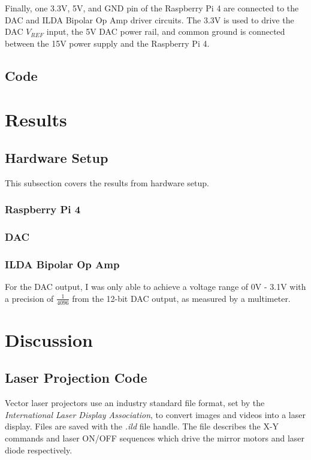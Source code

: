 \documentclass[journal]{IEEEtran}
\begin{document}
    Finally, one 3.3V, 5V, and GND pin of the Raspberry Pi 4 are connected to the DAC and ILDA Bipolar Op Amp driver circuits. 
    The 3.3V is used to drive the DAC $V_{REF}$ input, the 5V DAC power rail, and common ground is connected between the 15V power supply and the Raspberry Pi 4.

    \subsection{Code}


    \section{Results}
    \subsection{Hardware Setup}
    This subsection covers the results from hardware setup.

    \subsubsection{Raspberry Pi 4}
    \subsubsection{DAC}
    
    \subsubsection{ILDA Bipolar Op Amp}
    For the DAC output, I was only able to achieve a voltage range of 0V - 3.1V with a precision of $\frac{1}{4096}$ from the 12-bit DAC output, as measured by a multimeter.

    \section{Discussion}
    \subsection{Laser Projection Code}
    Vector laser projectors use an industry standard file format, set by the \emph{International Laser Display Association}, to convert images and videos into a laser display.
    Files are saved with the \emph{.ild} file handle.
    The file describes the X-Y commands and laser ON/OFF sequences which drive the mirror motors and laser diode respectively.
\end{document}
